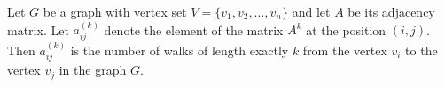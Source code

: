 

\setcounter{section}{1}
\setcounter{subsection}{4}
\setcounter{dfn}{13}

\begin{thm}
Let $G$ be a graph with vertex set $V = \{v_1, v_2, \ldots, v_n\}$ and let $A$ be its adjacency matrix.
Let $a^{(k)}_{ij}$ denote the element of the matrix $A^k$ at the position $(i,j)$.
Then $a^{(k)}_{ij}$ is the number of walks of length exactly $k$ from the vertex $v_i$ to the vertex $v_j$ in the graph $G$.
\end{thm}

